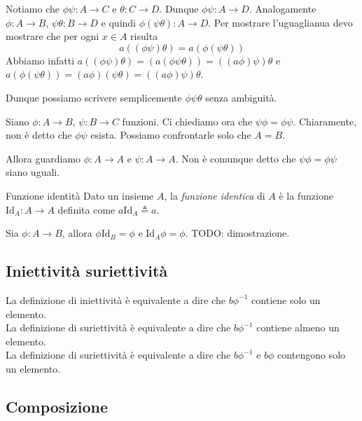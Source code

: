 \documentclass[a4paper]{article}
\begin{document}
\begin{snippetproof}{}
    Notiamo che \(\phi\psi \colon A \to C\) e \(\theta\colon C \to D\). Dunque
    \(\phi\psi \colon A \to D\). Analogamente \(\phi \colon A \to B\), \(\psi\theta\colon B\to D\)
    e quindi \(\phi (\psi \theta ) \colon A \to D\). Per mostrare l'uguaglianua devo mostrare che  per ogni \(x\in A\)
    risulta
    \[
        a((\phi\psi)\theta) = a(\phi(\psi \theta))
    \]
    Abbiamo infatti \(a((\phi\psi)\theta) = (a(\phi\psi\theta)) = ((a\phi)\psi)\theta\)
    e \(a(\phi(\psi \theta)) = (a\phi)(\psi\theta) = ((a\phi)\psi)\theta\).
\end{snippetproof}

Dunque possiamo scrivere semplicemente \(\phi\psi\theta\) senza ambiguità.

Siano \(\phi \colon A \to B\), \(\psi\colon B\to C\) funzioni. 
Ci chiediamo ora che \(\psi\phi = \phi\psi\). Chiaramente, non è detto
che \(\phi\psi\) esista. Possiamo confrontarle solo che \(A=B\).

Allora guardiamo \(\phi \colon A\to A\) e \(\psi \colon A\to A\).
Non è comunque detto che \(\psi\phi = \phi\psi\) siano uguali.

\begin{snippetdefinition}{Funzione identità}
    Dato un insieme \(A\), la \textit{funzione identica} di \(A\) è la funzione
    \(\text{Id}_A\colon A \to A\) definita come \(a\text{Id}_A \triangleq a\).
\end{snippetdefinition}

\begin{snippetproposition}{}
    Sia \(\phi\colon A \to B\), allora \(\phi\text{Id}_B=\phi\) e \(\text{Id}_A\phi=\phi\).
    TODO: dimostrazione.
\end{snippetproposition}

\subsection{Iniettività suriettività}

La definizione di iniettività è equivalente a dire che \(b\phi^{-1}\) contiene solo un elemento. \\
La definizione di suriettività è equivalente a dire che \(b\phi^{-1}\) contiene almeno un elemento. \\
La definizione di suriettività è equivalente a dire che \(b\phi^{-1}\) e \(b\phi\) contengono solo un elemento.

\subsection{Composizione}
\end{document}
